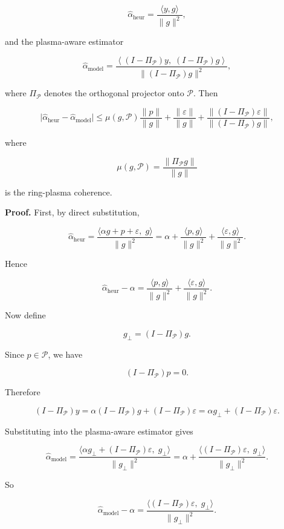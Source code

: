 \documentclass[10pt,letterpaper,twocolumn]{article}
\begin{document}
\[
\hat\alpha_{\mathrm{heur}} = \frac{\langle y,g\rangle}{\|g\|^2},
\]

and the plasma-aware estimator

\[
\hat\alpha_{\mathrm{model}}
=
\frac{\left\langle (I-\Pi_{\mathcal P})y,\; (I-\Pi_{\mathcal P})g\right\rangle}
{\|(I-\Pi_{\mathcal P})g\|^2},
\]

where \(\Pi_{\mathcal P}\) denotes the orthogonal projector onto
\(\mathcal P\). Then

\[
\bigl|\hat\alpha_{\mathrm{heur}}-\hat\alpha_{\mathrm{model}}\bigr|
\le
\mu(g,\mathcal P)\frac{\|p\|}{\|g\|}
+
\frac{\|\varepsilon\|}{\|g\|}
+
\frac{\|(I-\Pi_{\mathcal P})\varepsilon\|}{\|(I-\Pi_{\mathcal P})g\|},
\]

where

\[
\mu(g,\mathcal P)=\frac{\|\Pi_{\mathcal P}g\|}{\|g\|}
\]

is the ring-plasma coherence.

\par\smallskip\noindent{}\textbf{Proof.} First, by direct substitution,

\[
\hat\alpha_{\mathrm{heur}}
=
\frac{\langle \alpha g + p + \varepsilon,\; g\rangle}{\|g\|^2}
=
\alpha
+
\frac{\langle p,g\rangle}{\|g\|^2}
+
\frac{\langle \varepsilon,g\rangle}{\|g\|^2}.
\]

Hence

\[
\hat\alpha_{\mathrm{heur}}-\alpha
=
\frac{\langle p,g\rangle}{\|g\|^2}
+
\frac{\langle \varepsilon,g\rangle}{\|g\|^2}.
\]

Now define

\[
g_\perp = (I-\Pi_{\mathcal P})g.
\]

Since \(p \in \mathcal P\), we have

\[
(I-\Pi_{\mathcal P})p = 0.
\]

Therefore

\[
(I-\Pi_{\mathcal P})y
=
\alpha (I-\Pi_{\mathcal P})g + (I-\Pi_{\mathcal P})\varepsilon
=
\alpha g_\perp + (I-\Pi_{\mathcal P})\varepsilon.
\]

Substituting into the plasma-aware estimator gives

\[
\hat\alpha_{\mathrm{model}}
=
\frac{\langle \alpha g_\perp + (I-\Pi_{\mathcal P})\varepsilon,\; g_\perp\rangle}{\|g_\perp\|^2}
=
\alpha
+
\frac{\langle (I-\Pi_{\mathcal P})\varepsilon,\; g_\perp\rangle}{\|g_\perp\|^2}.
\]

So

\[
\hat\alpha_{\mathrm{model}}-\alpha
=
\frac{\langle (I-\Pi_{\mathcal P})\varepsilon,\; g_\perp\rangle}{\|g_\perp\|^2}.
\]
\end{document}
